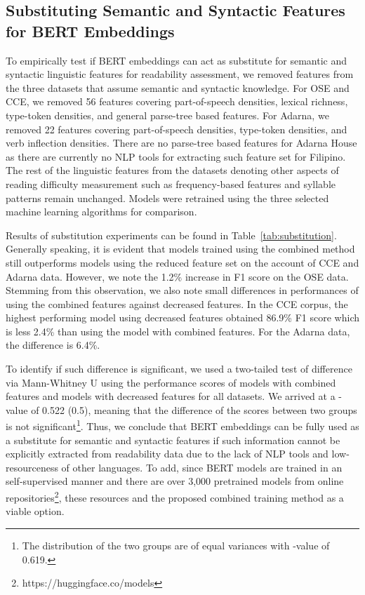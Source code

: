 \documentclass[11pt,a4paper]{article}
\begin{document}
\subsection{Substituting Semantic and Syntactic Features for BERT Embeddings}
To empirically test if BERT embeddings can act as substitute for semantic and syntactic linguistic features for readability assessment, we removed features from the three datasets that assume semantic and syntactic knowledge. For OSE and CCE, we removed 56 features covering part-of-speech densities, lexical richness, type-token densities, and general parse-tree based features. For Adarna, we removed 22 features covering part-of-speech densities, type-token densities, and verb inflection densities. There are no parse-tree based features for Adarna House as there are currently no NLP tools for extracting such feature set for Filipino. The rest of the linguistic features from the datasets denoting other aspects of reading difficulty measurement such as frequency-based features and syllable patterns remain unchanged. Models were retrained using the three selected machine learning algorithms for comparison.

Results of substitution experiments can be found in Table~\ref{tab:substitution}. Generally speaking, it is evident that models trained using the combined method still outperforms models using the reduced feature set on the account of CCE and Adarna data. However, we note the 1.2\% increase in F1 score on the OSE data. Stemming from this observation, we also note small differences in performances of using the combined features against decreased features. In the CCE corpus, the highest performing model using decreased features obtained 86.9\% F1 score which is less 2.4\% than using the model with combined features. For the Adarna data, the difference is 6.4\%.


To identify if such difference is significant, we used a two-tailed test of difference via Mann-Whitney U using the performance scores of models with combined features and models with decreased features for all datasets. We arrived at a -value of 0.522 (0.5), meaning that the difference of the scores between two groups is not significant\footnote{The distribution of the two groups are of equal variances with -value of 0.619.}. Thus, we conclude that BERT embeddings can be fully used as a substitute for semantic and syntactic features if such information cannot be explicitly extracted from readability data due to the lack of NLP tools and low-resourceness of other languages. To add, since BERT models are trained in an self-supervised manner and there are over 3,000 pretrained models from online repositories\footnote{https://huggingface.co/models}, these resources and the proposed combined training method as a viable option.
\end{document}

